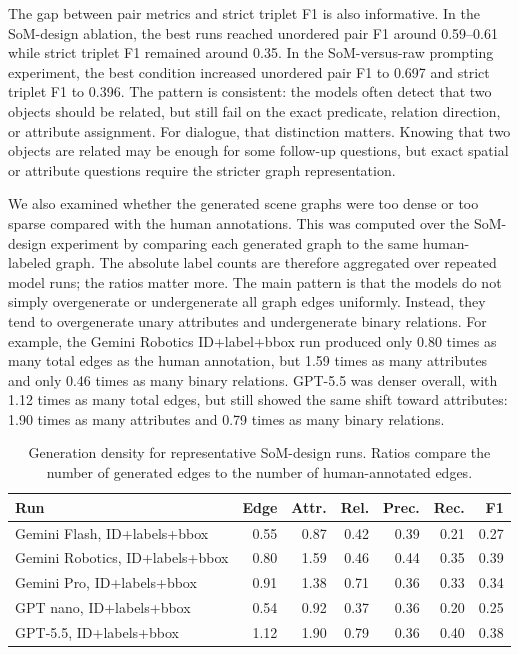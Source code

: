 The gap between pair metrics and strict triplet F1 is also informative. In the SoM-design ablation, the best runs reached unordered pair F1 around 0.59--0.61 while strict triplet F1 remained around 0.35. In the SoM-versus-raw prompting experiment, the best condition increased unordered pair F1 to 0.697 and strict triplet F1 to 0.396. The pattern is consistent: the models often detect that two objects should be related, but still fail on the exact predicate, relation direction, or attribute assignment. For dialogue, that distinction matters. Knowing that two objects are related may be enough for some follow-up questions, but exact spatial or attribute questions require the stricter graph representation.

We also examined whether the generated scene graphs were too dense or too sparse compared with the human annotations. This was computed over the SoM-design experiment by comparing each generated graph to the same human-labeled graph. The absolute label counts are therefore aggregated over repeated model runs; the ratios matter more. The main pattern is that the models do not simply overgenerate or undergenerate all graph edges uniformly. Instead, they tend to overgenerate unary attributes and undergenerate binary relations. For example, the Gemini Robotics ID+label+bbox run produced only 0.80 times as many total edges as the human annotation, but 1.59 times as many attributes and only 0.46 times as many binary relations. GPT-5.5 was denser overall, with 1.12 times as many total edges, but still showed the same shift toward attributes: 1.90 times as many attributes and 0.79 times as many binary relations.

\begin{table}[!htbp]
\centering
\scriptsize
\caption{Generation density for representative SoM-design runs. Ratios compare the number of generated edges to the number of human-annotated edges.}\label{tab:generation-density}
\begin{tabular}{@{}lrrrrrr@{}}
\toprule
Run & Edge & Attr. & Rel. & Prec. & Rec. & F1 \\
\midrule
Gemini Flash, ID+labels+bbox & 0.55 & 0.87 & 0.42 & 0.39 & 0.21 & 0.27 \\
Gemini Robotics, ID+labels+bbox & 0.80 & 1.59 & 0.46 & 0.44 & 0.35 & 0.39 \\
Gemini Pro, ID+labels+bbox & 0.91 & 1.38 & 0.71 & 0.36 & 0.33 & 0.34 \\
GPT nano, ID+labels+bbox & 0.54 & 0.92 & 0.37 & 0.36 & 0.20 & 0.25 \\
GPT-5.5, ID+labels+bbox & 1.12 & 1.90 & 0.79 & 0.36 & 0.40 & 0.38 \\
\bottomrule
\end{tabular}
\end{table}

